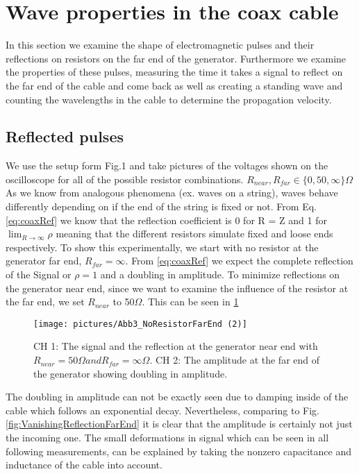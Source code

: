 \documentclass[a4paper,10pt,twocolumn]{article}
\begin{document}
    \section{Wave properties in the coax cable}
    In this section we examine the shape of electromagnetic pulses and their reflections on resistors on the far end of the generator.
    Furthermore we examine the properties of these pulses, measuring the time it takes a signal to reflect on the far end of the cable and come back as well as creating a standing wave and counting the wavelengths in the cable to determine the propagation velocity.
    
    \subsection{Reflected pulses}\label{subsec:WaveProperitesInTheCoax}
    We use the setup form Fig.1 and take pictures of the voltages shown on the oscilloscope for all of the possible resistor combinations. $R_{near}, R_{far} \in \{ 0,50,\infty\} \Omega$
    As we know from analogous phenomena (ex. waves on a string), waves behave differently depending on if the end of the string is fixed or not.
    From Eq. \ref{eq:coaxRef} we know that the reflection coefficient is 0 for R = Z and 1 for $\lim_{R \to \infty}\rho$ meaning that the different resistors simulate fixed and loose ends respectively.
    To show this experimentally, we start with no resistor at the generator far end, $R_{far} = \infty$.
    From \ref{eq:coaxRef} we expect the complete reflection of the Signal or $\rho = 1$ and a doubling in amplitude.
    To minimize reflections on the generator near end, since we want to examine the influence of the resistor at the far end, we set $R_{near}$ to 50$\Omega$.
    This can be seen in \ref{fig:NoResistorFarEnd}
    \begin{figure}[htbp]                                 %
        \begin{center}                                       %
            \texttt{[image: pictures/Abb3\_NoResistorFarEnd (2)]}      %
            \caption[]{CH 1: The signal and the reflection at the generator near end with $R_{near}=50\Omega and R_{far} = \infty\Omega.$ CH 2: The amplitude at the far end of the generator showing doubling in amplitude.}   %
            \label{fig:NoResistorFarEnd}                                      %
        \end{center}
    \end{figure}
    The doubling in amplitude can not be exactly seen due to damping inside of the cable which follows an exponential decay.
    Nevertheless, comparing to Fig. \ref{fig:VanishingReflectionFarEnd} it is clear that the amplitude is certainly not just the incoming one.
    The small deformations in signal which can be seen in all following measurements, can be explained by taking the nonzero capacitance and inductance of the cable into account. 
    
\end{document}
